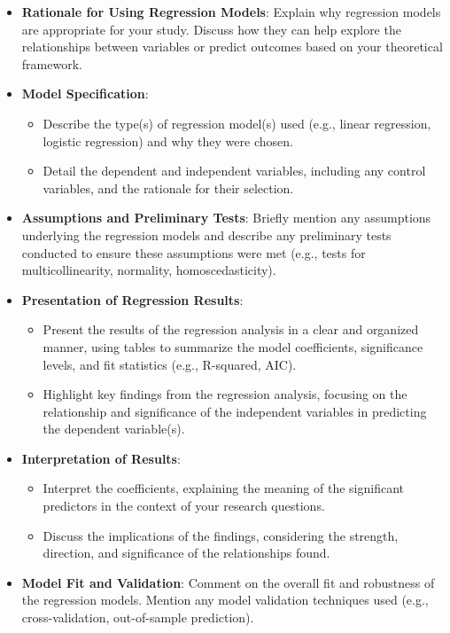 \documentclass[
  12pt,
]{article}
\begin{document}
\begin{itemize}
\item
  \textbf{Rationale for Using Regression Models}: Explain why regression
  models are appropriate for your study. Discuss how they can help
  explore the relationships between variables or predict outcomes based
  on your theoretical framework.
\item
  \textbf{Model Specification}:

  \begin{itemize}
  \item
    Describe the type(s) of regression model(s) used (e.g., linear
    regression, logistic regression) and why they were chosen.
  \item
    Detail the dependent and independent variables, including any
    control variables, and the rationale for their selection.
  \end{itemize}
\item
  \textbf{Assumptions and Preliminary Tests}: Briefly mention any
  assumptions underlying the regression models and describe any
  preliminary tests conducted to ensure these assumptions were met
  (e.g., tests for multicollinearity, normality, homoscedasticity).
\item
  \textbf{Presentation of Regression Results}:

  \begin{itemize}
  \item
    Present the results of the regression analysis in a clear and
    organized manner, using tables to summarize the model coefficients,
    significance levels, and fit statistics (e.g., R-squared, AIC).
  \item
    Highlight key findings from the regression analysis, focusing on the
    relationship and significance of the independent variables in
    predicting the dependent variable(s).
  \end{itemize}
\item
  \textbf{Interpretation of Results}:

  \begin{itemize}
  \item
    Interpret the coefficients, explaining the meaning of the
    significant predictors in the context of your research questions.
  \item
    Discuss the implications of the findings, considering the strength,
    direction, and significance of the relationships found.
  \end{itemize}
\item
  \textbf{Model Fit and Validation}: Comment on the overall fit and
  robustness of the regression models. Mention any model validation
  techniques used (e.g., cross-validation, out-of-sample prediction).
\end{itemize}
\end{document}
